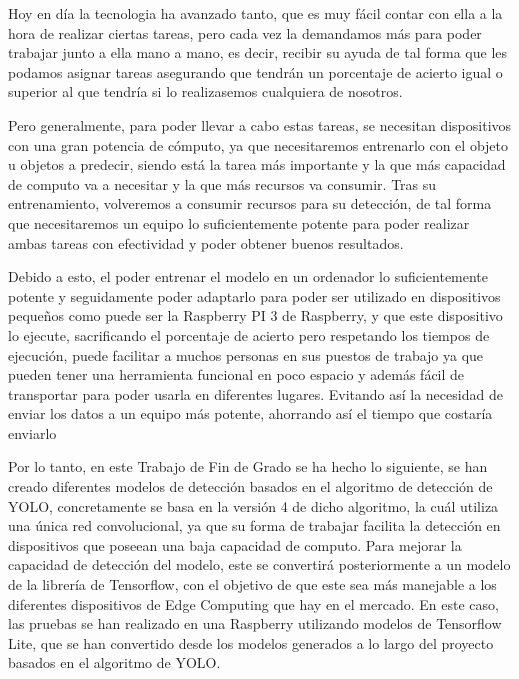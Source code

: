 
Hoy en día la tecnologia ha avanzado tanto, que es muy fácil contar con ella a la hora de realizar ciertas tareas, pero cada vez la demandamos 
más para poder trabajar junto a ella mano a mano, es decir, recibir su ayuda de tal forma que les podamos asignar tareas asegurando que tendrán un
porcentaje de acierto igual o superior al que tendría si lo realizasemos cualquiera de nosotros.

Pero generalmente, para poder llevar a cabo estas tareas, se necesitan dispositivos con una gran potencia de cómputo, ya que necesitaremos entrenarlo 
con el objeto u objetos a predecir, siendo está la tarea más importante y la que más capacidad de computo va a necesitar y la que más recursos va consumir.
Tras su entrenamiento, volveremos a consumir recursos para su detección, de tal forma que necesitaremos un equipo lo suficientemente potente para poder realizar
ambas tareas con efectividad y poder obtener buenos resultados.

Debido a esto, el poder entrenar el modelo en un ordenador lo suficientemente potente y seguidamente poder adaptarlo para poder ser utilizado en dispositivos pequeños
como puede ser la Raspberry PI 3 de Raspberry, y que este dispositivo lo ejecute, sacrificando el porcentaje de acierto pero respetando los tiempos de ejecución, puede facilitar a
muchos personas en sus puestos de trabajo ya que pueden tener una herramienta funcional en poco espacio y además fácil de transportar para poder usarla en diferentes
lugares. Evitando así la necesidad de enviar los datos a un equipo más potente, ahorrando así el tiempo que costaría enviarlo

Por lo tanto, en este Trabajo de Fin de Grado se ha hecho lo siguiente, se han creado diferentes modelos de detección basados en el algoritmo de detección de YOLO, concretamente se basa en la versión 4 de dicho algoritmo, la cuál utiliza una única red convolucional, ya que su forma de trabajar facilita la detección en dispositivos que poseean una baja capacidad de computo.
Para mejorar la capacidad de detección del modelo, este se convertirá posteriormente a un modelo de la librería de Tensorflow, con el objetivo de que este sea más manejable a los diferentes dispositivos de Edge Computing que hay en el mercado.
En este caso, las pruebas se han realizado en una Raspberry utilizando modelos de Tensorflow Lite, que se han convertido desde los modelos generados a lo largo del proyecto basados en el algoritmo de YOLO.

